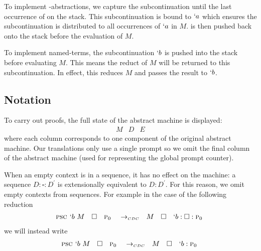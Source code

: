 To implement \lmu-abstractions, we capture the subcontinuation until the last occurrence of \gp on the stack.
This subcontinuation is bound to $`a$ which ensures the subcontinuation is distributed to all occurrences of $`a$ in $M$.
\gp is then pushed back onto the stack before the evaluation of $M$.

To implement named-terms, the subcontinuation $`b$ is pushed into the stack before evaluating $M$.
This means the reduct of $M$ will be returned to this subcontinuation.
In effect, this reduces $M$ and passes the result to $`b$.

\subsection{Notation}
To carry out proofs, the full state of the abstract machine is displayed:
\[
\begin{array}{lll}
  M & D & E
\end{array}
\]
where each column corresponds to one component of the original abstract machine.
Our translations only use a single prompt so we omit the final column of the abstract machine 
(used for representing the global prompt counter).

When an empty context is in a sequence, it has no effect on the machine:
a sequence $D:\square:D^\prime$ is extensionally equivalent to $D:D^\prime$.
For this reason, we omit empty contexts from sequences.
For example in the case of the following reduction
\[
\begin{array}{lllclll}
  \textsc{psc } `b\ M & \square & \textsc{p$_0$ } & \to_{\scriptscriptstyle{CDC}}& M & \square & `b:\square:\textsc{p$_0$ }
\end{array}
\]
we will instead write
\[
\begin{array}{lllclll}
  \textsc{psc } `b\ M & \square & \textsc{p$_0$ } & \to_{\scriptscriptstyle{CDC}}& M & \square & `b:\textsc{p$_0$ }
\end{array}
\]


